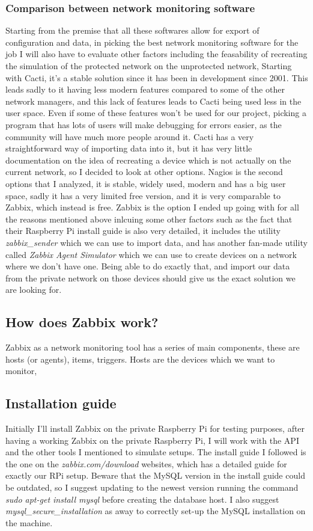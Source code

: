 \documentclass[a4paper,11pt]{scrartcl}
\begin{document}
\subsubsection{Comparison between network monitoring software}
Starting from the premise that all these softwares allow for export of configuration and data, in picking the best network monitoring software for the job I will also have to evaluate other factors including the feasability of recreating the simulation of the protected network on the unprotected network, 
Starting with Cacti, it's a stable solution since it has been in development since 2001. This leads sadly to it having less modern features compared to some of the other network managers, and this lack of features leads to Cacti being used less in the user space. Even if some of these features won't be used for our project, picking a program that has lots of users will make debugging for errors easier, as the community will have much more people around it. Cacti has a very straightforward way of importing data into it, but it has very little documentation on the idea of recreating a device which is not actually on the current network, so I decided to look at other options.
Nagios is the second options that I analyzed, it is stable, widely used, modern and has a big user space, sadly it has a very limited free version, and it is very comparable to Zabbix, which instead is free. Zabbix is the option I ended up going with for all the reasons mentioned above inlcuing some other factors such as the fact that their Raspberry Pi install guide is also very detailed, it includes the utility \textit{zabbix\_sender} which we can use to import data, and has another fan-made utility called \textit{Zabbix Agent Simulator} which we can use to create devices on a network where we don't have one. Being able to do exactly that, and import our data from the private network on those devices should give us the exact solution we are looking for.

\subsection{How does Zabbix work?}
Zabbix as a network monitoring tool has a series of main components, these are hosts (or agents), items, triggers.
Hosts are the devices which we want to monitor, 

\subsection{Installation guide}
Initially I'll install Zabbix on the private Raspberry Pi for testing purposes, after having a working Zabbix on the private Raspberry Pi, I will work with the API and the other tools I mentioned to simulate setups. The install guide I followed is the one on the \textit{zabbix.com/download} websites, which has a detailed guide for exactly our RPi setup. Beware that the MySQL version in the install guide could be outdated, so I suggest updating to the newest version running the command \textit{sudo apt-get install mysql} before creating the database host. I also suggest \textit{mysql\_secure\_installation} as away to correctly set-up the MySQL installation on the machine. 
\end{document}
